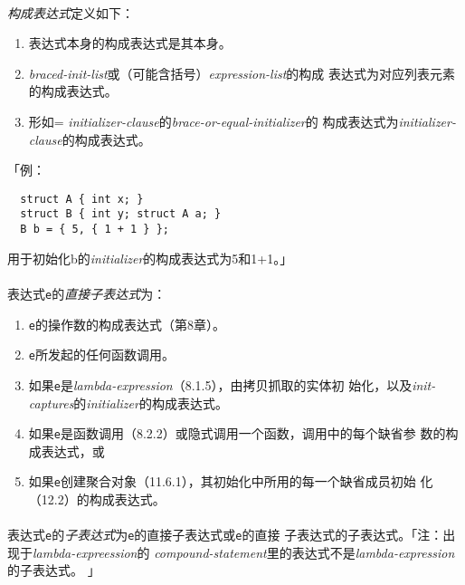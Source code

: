\paragraph{}
\textit{构成表达式}定义如下：
\begin{enumerate}
  \item 表达式本身的构成表达式是其本身。
  \item \textit{braced-init-list}或（可能含括号）\textit{expression-list}的构成
    表达式为对应列表元素的构成表达式。
  \item 形如= \textit{initializer-clause}的\textit{brace-or-equal-initializer}的
    构成表达式为\textit{initializer-clause}的构成表达式。
\end{enumerate}
「例：
\begin{lstlisting}
  struct A { int x; }
  struct B { int y; struct A a; }
  B b = { 5, { 1 + 1 } };
\end{lstlisting}
用于初始化b的\textit{initializer}的构成表达式为5和1+1。」

\paragraph{}
表达式\texttt{e}的\textit{直接子表达式}为：
\begin{enumerate}
  \item \texttt{e}的操作数的构成表达式（第8章）。
  \item \texttt{e}所发起的任何函数调用。
  \item 如果\texttt{e}是\textit{lambda-expression}（8.1.5），由拷贝抓取的实体初
    始化，以及\textit{init-captures}的\textit{initializer}的构成表达式。
  \item 如果\texttt{e}是函数调用（8.2.2）或隐式调用一个函数，调用中的每个缺省参
    数的构成表达式，或
  \item 如果\texttt{e}创建聚合对象（11.6.1），其初始化中所用的每一个缺省成员初始
    化（12.2）的构成表达式。
\end{enumerate}

\paragraph{}
表达式\texttt{e}的\textit{子表达式}为\texttt{e}的直接子表达式或\texttt{e}的直接
子表达式的子表达式。「注：出现于\textit{lambda-expreession}的
\textit{compound-statement}里的表达式不是\textit{lambda-expression}的子表达式。
」

